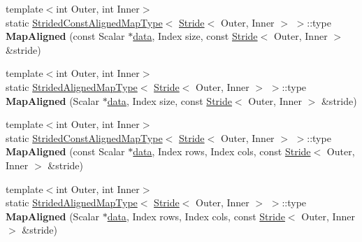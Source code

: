 \begin{Indent}
\begin{DoxyCompactItemize}
\item 
\mbox{\label{class_eigen_1_1_plain_object_base_a91374e2e77a219a44d980cc14be3a961}} 
{\footnotesize template$<$int Outer, int Inner$>$ }\\static \mbox{\hyperlink{struct_eigen_1_1_plain_object_base_1_1_strided_const_aligned_map_type}{Strided\+Const\+Aligned\+Map\+Type}}$<$ \mbox{\hyperlink{class_eigen_1_1_stride}{Stride}}$<$ Outer, Inner $>$ $>$\+::type {\bfseries Map\+Aligned} (const Scalar $\ast$\mbox{\hyperlink{class_eigen_1_1_plain_object_base_ac25699535374b1854cf8494e44ad31b2}{data}}, Index size, const \mbox{\hyperlink{class_eigen_1_1_stride}{Stride}}$<$ Outer, Inner $>$ \&stride)
\item 
\mbox{\label{class_eigen_1_1_plain_object_base_a2b1ce06138d53af1bb729ec1dab87e5a}} 
{\footnotesize template$<$int Outer, int Inner$>$ }\\static \mbox{\hyperlink{struct_eigen_1_1_plain_object_base_1_1_strided_aligned_map_type}{Strided\+Aligned\+Map\+Type}}$<$ \mbox{\hyperlink{class_eigen_1_1_stride}{Stride}}$<$ Outer, Inner $>$ $>$\+::type {\bfseries Map\+Aligned} (Scalar $\ast$\mbox{\hyperlink{class_eigen_1_1_plain_object_base_ac25699535374b1854cf8494e44ad31b2}{data}}, Index size, const \mbox{\hyperlink{class_eigen_1_1_stride}{Stride}}$<$ Outer, Inner $>$ \&stride)
\item 
\mbox{\label{class_eigen_1_1_plain_object_base_a48fbb5cbf164540617c5ca3e05afe953}} 
{\footnotesize template$<$int Outer, int Inner$>$ }\\static \mbox{\hyperlink{struct_eigen_1_1_plain_object_base_1_1_strided_const_aligned_map_type}{Strided\+Const\+Aligned\+Map\+Type}}$<$ \mbox{\hyperlink{class_eigen_1_1_stride}{Stride}}$<$ Outer, Inner $>$ $>$\+::type {\bfseries Map\+Aligned} (const Scalar $\ast$\mbox{\hyperlink{class_eigen_1_1_plain_object_base_ac25699535374b1854cf8494e44ad31b2}{data}}, Index rows, Index cols, const \mbox{\hyperlink{class_eigen_1_1_stride}{Stride}}$<$ Outer, Inner $>$ \&stride)
\item 
\mbox{\label{class_eigen_1_1_plain_object_base_af2ce47a0cde3943e528e00f2b191f7da}} 
{\footnotesize template$<$int Outer, int Inner$>$ }\\static \mbox{\hyperlink{struct_eigen_1_1_plain_object_base_1_1_strided_aligned_map_type}{Strided\+Aligned\+Map\+Type}}$<$ \mbox{\hyperlink{class_eigen_1_1_stride}{Stride}}$<$ Outer, Inner $>$ $>$\+::type {\bfseries Map\+Aligned} (Scalar $\ast$\mbox{\hyperlink{class_eigen_1_1_plain_object_base_ac25699535374b1854cf8494e44ad31b2}{data}}, Index rows, Index cols, const \mbox{\hyperlink{class_eigen_1_1_stride}{Stride}}$<$ Outer, Inner $>$ \&stride)
\end{DoxyCompactItemize}
\end{Indent}
